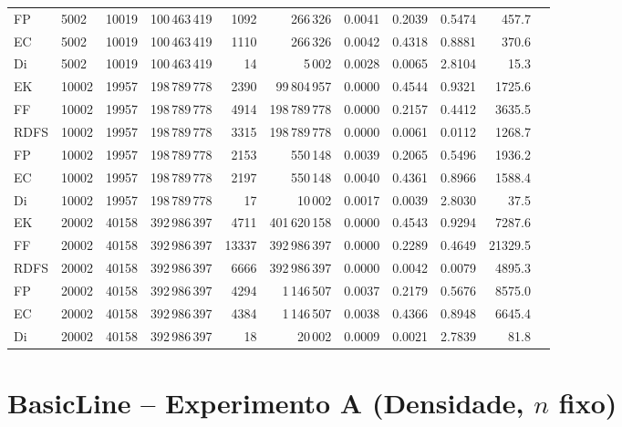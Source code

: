 \documentclass{infufrgs}
\begin{document}
\begin{table}[H]
{\begin{tabular}{llrrrrrrrrr}
FP   & 5002  & 10019  & 100\,463\,419 &  1092 & 266\,326       & 0.0041 & 0.2039 & 0.5474 &   457.7 \\
EC   & 5002  & 10019  & 100\,463\,419 &  1110 & 266\,326       & 0.0042 & 0.4318 & 0.8881 &   370.6 \\
Di   & 5002  & 10019  & 100\,463\,419 &    14 & 5\,002         & 0.0028 & 0.0065 & 2.8104 &    15.3 \\
\midrule
EK   & 10002 & 19957  & 198\,789\,778 &  2390 & 99\,804\,957  & 0.0000 & 0.4544 & 0.9321 &  1725.6 \\
FF   & 10002 & 19957  & 198\,789\,778 &  4914 & 198\,789\,778 & 0.0000 & 0.2157 & 0.4412 &  3635.5 \\
RDFS & 10002 & 19957  & 198\,789\,778 &  3315 & 198\,789\,778 & 0.0000 & 0.0061 & 0.0112 &  1268.7 \\
FP   & 10002 & 19957  & 198\,789\,778 &  2153 & 550\,148       & 0.0039 & 0.2065 & 0.5496 &  1936.2 \\
EC   & 10002 & 19957  & 198\,789\,778 &  2197 & 550\,148       & 0.0040 & 0.4361 & 0.8966 &  1588.4 \\
Di   & 10002 & 19957  & 198\,789\,778 &    17 & 10\,002        & 0.0017 & 0.0039 & 2.8030 &    37.5 \\
\midrule
EK   & 20002 & 40158  & 392\,986\,397 &  4711 & 401\,620\,158 & 0.0000 & 0.4543 & 0.9294 &  7287.6 \\
FF   & 20002 & 40158  & 392\,986\,397 & 13337 & 392\,986\,397 & 0.0000 & 0.2289 & 0.4649 & 21329.5 \\
RDFS & 20002 & 40158  & 392\,986\,397 &  6666 & 392\,986\,397 & 0.0000 & 0.0042 & 0.0079 &  4895.3 \\
FP   & 20002 & 40158  & 392\,986\,397 &  4294 & 1\,146\,507   & 0.0037 & 0.2179 & 0.5676 &  8575.0 \\
EC   & 20002 & 40158  & 392\,986\,397 &  4384 & 1\,146\,507   & 0.0038 & 0.4366 & 0.8948 &  6645.4 \\
Di   & 20002 & 40158  & 392\,986\,397 &    18 & 20\,002        & 0.0009 & 0.0021 & 2.7839 &    81.8 \\
\bottomrule
\end{tabular}}
\end{table}

\section{BasicLine -- Experimento A (Densidade, $n$ fixo)}
\end{document}
